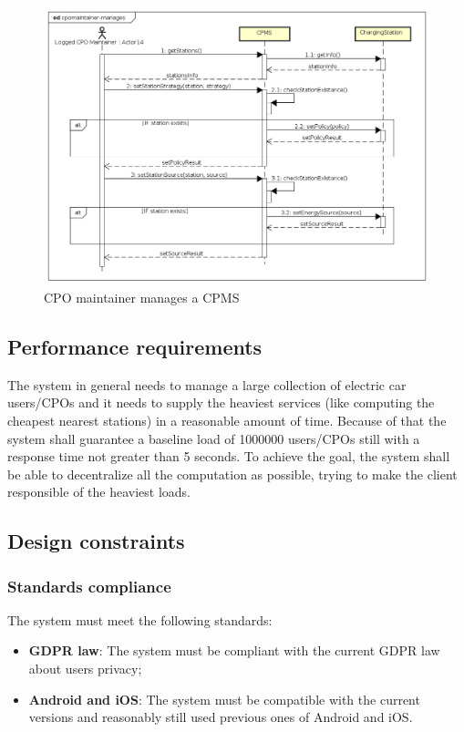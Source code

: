 \begin{figure}[!h]
    \begin{center}
        \includegraphics[keepaspectratio, width=16cm]{Sequence/cpomaintainer-manages.png}
        \caption{\ac{CPO} maintainer manages a \ac{CPMS}}
    \end{center}
\end{figure}

\clearpage
\subsection{Performance requirements}
The system in general needs to manage a large collection of electric car users/\acp{CPO} and it needs to supply the heaviest services (like computing the cheapest nearest stations) in a reasonable amount of time.
Because of that the system shall guarantee a baseline load of 1000000 users/\acp{CPO} still with a response time not greater than 5 seconds. To achieve the goal, the system shall be able to decentralize all the computation as possible,
trying to make the client responsible of the heaviest loads.
\subsection{Design constraints}
\subsubsection{Standards compliance}
The system must meet the following standards:
\begin{itemize}
    \item \textbf{\ac{GDPR} law}: The system must be compliant with the current GDPR law about users privacy;
    \item \textbf{Android and iOS}: The system must be compatible with the current versions and reasonably still used previous ones of Android and iOS.
\end{itemize}
